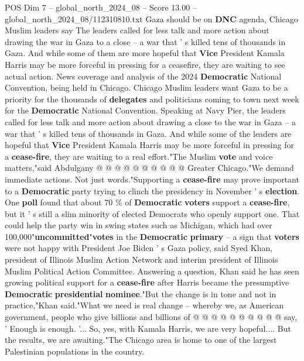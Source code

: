 \begin{textsample}{POS Dim 7 – global\_north\_2024\_08 – Score 13.00 – global\_north\_2024\_08/112310810.txt}  \label{ex:f7_pos_010}
Gaza should be on \textbf{DNC} agenda, Chicago Muslim leaders say The leaders called for less talk and more action about drawing the war in Gaza to a close -- a war that ' s killed tens of thousands in Gaza.
And while some of them are more hopeful that \textbf{Vice} President Kamala Harris may be more forceful in pressing for a ceasefire, they are waiting to see actual action.
News coverage and analysis of the 2024 \textbf{Democratic} National Convention, being held in Chicago.
Chicago Muslim leaders want Gaza to be a priority for the thousands of \textbf{delegates} and politicians coming to town next week for the \textbf{Democratic} National Convention.
Speaking at Navy Pier, the leaders called for less talk and more action about drawing a close to the war in Gaza -- a war that ' s killed tens of thousands in Gaza.
And while some of the leaders are hopeful that \textbf{Vice} President Kamala Harris may be more forceful in pressing for a \textbf{cease-fire}, they are waiting to a real effort."The Muslim \textbf{vote} and voice matters,"said Abdulgany @ @ @ @ @ @ @ @ @ @ Greater Chicago."We demand immediate actions.
Not just words."Supporting a \textbf{cease-fire} may prove important to a \textbf{Democratic} party trying to clinch the presidency in November ' s \textbf{election}.
One \textbf{poll} found that about 70 \% of \textbf{Democratic} \textbf{voters} support a \textbf{cease-fire}, but it ' s still a slim minority of elected Democrats who openly support one.
That could help the party win in swing states such as Michigan, which had over 100,000"\textbf{uncommitted}"\textbf{votes} in the \textbf{Democratic} \textbf{primary} -- a sign that \textbf{voters} were not happy with President Joe Biden ' s Gaza policy, said Syed Khan, president of Illinois Muslim Action Network and interim president of Illinois Muslim Political Action Committee.
Answering a question, Khan said he has seen growing political support for a \textbf{cease-fire} after Harris became the presumptive \textbf{Democratic} \textbf{presidential} \textbf{nominee}."But the change is in tone and not in practice,"Khan said."What we need is real change -- whereby we, as American government, people who give billions and billions of @ @ @ @ @ @ @ @ @ @ say, ' Enough is enough. '...
So, yes, with Kamala Harris, we are very hopeful....
But the results, we are awaiting."The Chicago area is home to one of the largest Palestinian populations in the country.

\end{textsample}
